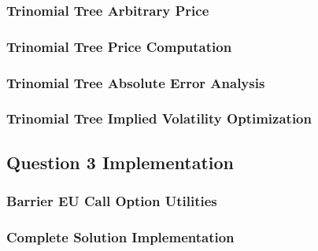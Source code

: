 \documentclass[10pt]{article}
\begin{document}
        \subsubsection{Trinomial Tree Arbitrary Price} \label{appendix:source:q2:arb_price}

            

        \subsubsection{Trinomial Tree Price Computation} \label{appendix:source:q2:prices}

            
        
        \subsubsection{Trinomial Tree Absolute Error Analysis} \label{appendix:source:q2:abs_error}

            
        
        \subsubsection{Trinomial Tree Implied Volatility Optimization} \label{appendix:source:q2:imp_vol}

            

    \newpage
    \subsection{Question 3 Implementation} \label{appendix:source:q3}

        \subsubsection{Barrier EU Call Option Utilities} \label{appendix:source:q3:util}

            

        \subsubsection{Complete Solution Implementation}

            

\end{document}
